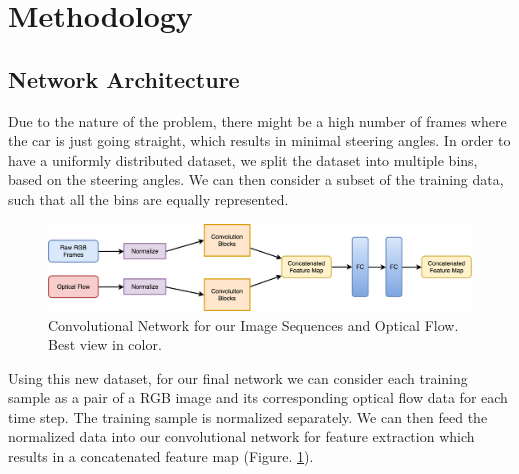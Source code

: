 \documentclass[10pt,twocolumn,letterpaper]{article}
\begin{document}
\section{Methodology}
\subsection{Network Architecture}
 Due to the nature of the problem, there might be a high number of frames where the car is just going straight, which results in minimal steering angles. In order to have a uniformly  distributed dataset, we split the dataset into multiple bins, based on the steering angles. We can then consider a subset of the training data, such that all the bins are equally represented. 
 
 \begin{figure} [ht]
 	\centering
 	\includegraphics[scale=0.11]{conv_network}
 	\caption{Convolutional Network for our Image Sequences and Optical Flow. Best view in color.}
 	\label{fig:convNet}
 \end{figure}
 
 
 Using this new dataset, for our final network we can consider each training sample as a pair of a RGB image and its corresponding optical flow data for each time step. The training sample is normalized separately. We can then feed the normalized data into our convolutional network for feature extraction which results in a concatenated feature map (Figure. \ref{fig:convNet}).
 
\end{document}
